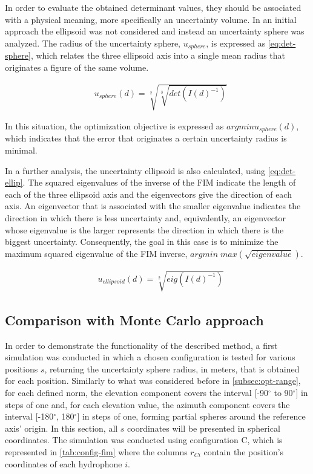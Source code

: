 In order to evaluate the obtained determinant values, they should be associated with a physical meaning, more specifically an uncertainty volume. In an initial approach the ellipsoid was not considered and instead an uncertainty sphere was analyzed. The radius of the uncertainty sphere, $u_{sphere}$, is expressed as \ref{eq:det-sphere}, which relates the three ellipsoid axis into a single mean radius that originates a figure of the same volume.

\begin{eqnarray}
	& u_{sphere}(d) = \sqrt[2]{\sqrt[3]{det(I(d)^{-1})}}
	\label{eq:det-sphere}
\end{eqnarray}

In this situation, the optimization objective is expressed as $argmin u_{sphere}(d)$, which indicates that the error that originates a certain uncertainty radius is minimal.

In a further analysis, the uncertainty ellipsoid is also calculated, using \ref{eq:det-ellip}. The squared eigenvalues of the inverse of the FIM indicate the length of each of the three ellipsoid axis and the eigenvectors give the direction of each axis. An eigenvector that is associated with the smaller eigenvalue indicates the direction in which there is less uncertainty and, equivalently, an eigenvector whose eigenvalue is the larger represents the direction in which there is the biggest uncertainty. Consequently, the goal in this case is to minimize the maximum squared eigenvalue of the FIM inverse, $argmin \; max(\sqrt{eigenvalue})$.

\begin{eqnarray}
	& u_{ellipsoid}(d) = \sqrt[2]{eig(I(d)^{-1})}
	\label{eq:det-ellip}
\end{eqnarray}

\subsection{Comparison with Monte Carlo approach}

In order to demonstrate the functionality of the described method, a first simulation was conducted in which a chosen configuration is tested for various positions $s$, returning the uncertainty sphere radius, in meters, that is obtained for each position. Similarly to what was considered before in \ref{subsec:opt-range}, for each defined norm, the elevation component covers the interval [-90$^{\circ}$ to 90$^{\circ}$] in steps of one and, for each elevation value, the azimuth component covers the interval [-180$^{\circ}$, 180$^{\circ}$] in steps of one, forming partial spheres around the reference axis' origin. In this section, all $s$ coordinates will be presented in spherical coordinates. The simulation was conducted using configuration C, which is represented in \ref{tab:config-fim} where the columns $r_{Ci}$ contain the position's coordinates of each hydrophone $i$.

